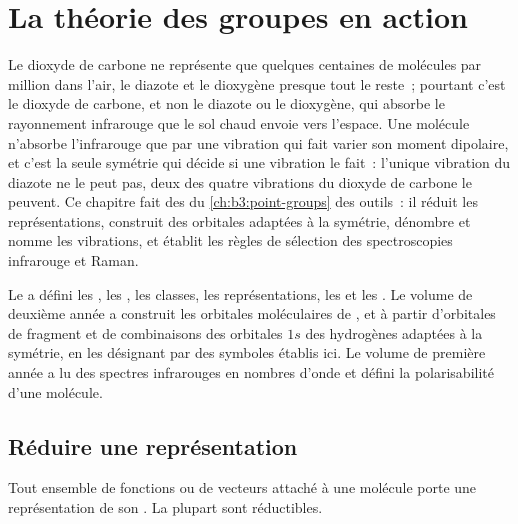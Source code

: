 \chapter{La théorie des groupes en action}\label{ch:b3:group-theory-applied}

Le dioxyde de carbone ne représente que quelques centaines de molécules
par million dans l'air, le diazote et le dioxygène presque tout le
reste~; pourtant c'est le dioxyde de carbone, et non le diazote ou le
dioxygène, qui absorbe le rayonnement infrarouge que le sol chaud envoie
vers l'espace. Une molécule n'absorbe l'infrarouge que par une vibration
qui fait varier son moment dipolaire, et c'est la seule symétrie qui
décide si une vibration le fait~: l'unique vibration du diazote ne le
peut pas, deux des quatre vibrations du dioxyde de carbone le peuvent. Ce
chapitre fait des  du \cref{ch:b3:point-groups} des
outils~: il réduit les représentations, construit des orbitales adaptées
à la symétrie, dénombre et nomme les vibrations, et établit les règles de
sélection des spectroscopies infrarouge et Raman.

\begin{recall}
Le  a défini les , les
, les classes, les représentations, les  et
les . Le volume de deuxième année a construit les
orbitales moléculaires de ,  et  à partir
d'orbitales de fragment et de combinaisons des orbitales $1s$ des
hydrogènes adaptées à la symétrie, en les désignant par des symboles
établis ici. Le volume de première année a lu des spectres infrarouges
en nombres d'onde et défini la polarisabilité d'une molécule.
\end{recall}

\section{Réduire une représentation}

Tout ensemble de fonctions ou de vecteurs attaché à une molécule porte une
représentation de son . La plupart sont réductibles.

